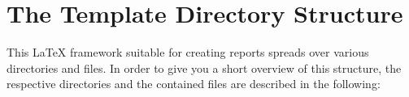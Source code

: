
\chapter{The Template Directory Structure}

This \LaTeX{} framework suitable for creating reports spreads over
various directories and files. In order to give you a short overview
of this structure, the respective directories and the contained files
are described in the following:

